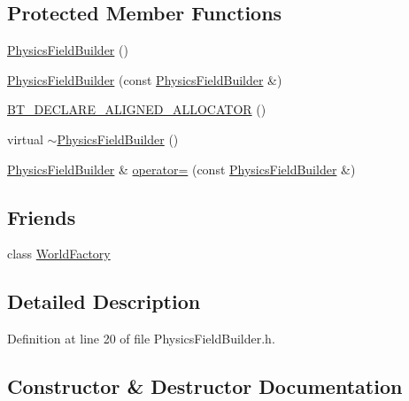 \subsection*{Protected Member Functions}
\begin{DoxyCompactItemize}
\item 
\mbox{\hyperlink{classnjli_1_1_physics_field_builder_a95423d081d494102a825469955b93731}{Physics\+Field\+Builder}} ()
\item 
\mbox{\hyperlink{classnjli_1_1_physics_field_builder_a3a79f5d4bfdf77e2c41cdfad8ce61f66}{Physics\+Field\+Builder}} (const \mbox{\hyperlink{classnjli_1_1_physics_field_builder}{Physics\+Field\+Builder}} \&)
\item 
\mbox{\hyperlink{classnjli_1_1_physics_field_builder_a61855181b09fba8e1f01c3626d55abe1}{B\+T\+\_\+\+D\+E\+C\+L\+A\+R\+E\+\_\+\+A\+L\+I\+G\+N\+E\+D\+\_\+\+A\+L\+L\+O\+C\+A\+T\+OR}} ()
\item 
virtual \mbox{\hyperlink{classnjli_1_1_physics_field_builder_a67111b5d783b93e2098cef2025442b1d}{$\sim$\+Physics\+Field\+Builder}} ()
\item 
\mbox{\hyperlink{classnjli_1_1_physics_field_builder}{Physics\+Field\+Builder}} \& \mbox{\hyperlink{classnjli_1_1_physics_field_builder_a5878f42248d40f6756cad0d1a5d691fd}{operator=}} (const \mbox{\hyperlink{classnjli_1_1_physics_field_builder}{Physics\+Field\+Builder}} \&)
\end{DoxyCompactItemize}
\subsection*{Friends}
\begin{DoxyCompactItemize}
\item 
class \mbox{\hyperlink{classnjli_1_1_physics_field_builder_acb96ebb09abe8f2a37a915a842babfac}{World\+Factory}}
\end{DoxyCompactItemize}


\subsection{Detailed Description}


Definition at line 20 of file Physics\+Field\+Builder.\+h.



\subsection{Constructor \& Destructor Documentation}
\mbox{\label{classnjli_1_1_physics_field_builder_a95423d081d494102a825469955b93731}} 
